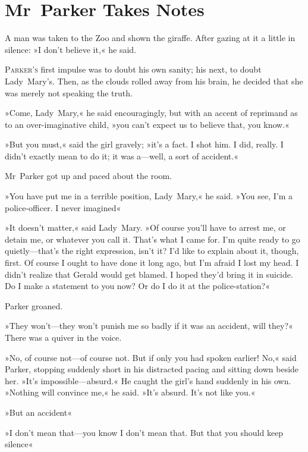 

\chapter{Mr~Parker Takes Notes}

\epigraph{A man was taken to the Zoo and shown the giraffe.  After gazing at it a little in silence: »I don't believe it,« he said.}{}


\lettrine[lines=4]{P}{arker's} first impulse was to doubt his own sanity; his next, to doubt Lady~Mary's. Then, as the clouds rolled away from his brain, he decided that she was merely not speaking the truth.

\zz
»Come, Lady~Mary,« he said encouragingly, but with an accent of reprimand as to an over-imaginative child, »you can't expect us to believe that, you know.«

»But you must,« said the girl gravely; »it's a fact. I shot him. I did, really. I didn't exactly mean to do it; it was a—well, a sort of accident.«

Mr~Parker got up and paced about the room.

»You have put me in a terrible position, Lady~Mary,« he said. »You see, I'm a police-officer. I never imagined\longdash«

»It doesn't matter,« said Lady~Mary. »Of course you'll have to arrest me, or detain me, or whatever you call it. That's what I came for. I'm quite ready to go quietly—that's the right expression, isn't it? I'd like to explain about it, though, first. Of course I ought to have done it long ago, but I'm afraid I lost my head. I didn't realize that Gerald would get blamed. I hoped they'd bring it in suicide. Do I make a statement to you now? Or do I do it at the police-station?«

Parker groaned.

»They won't—they won't punish me so badly if it was an accident, will they?« There was a quiver in the voice.

»No, of course not—of course not. But if only you had spoken earlier!  No,« said Parker, stopping suddenly short in his distracted pacing and sitting down beside her. »It's impossible—absurd.« He caught the girl's hand suddenly in his own. »Nothing will convince me,« he said.  »It's absurd. It's not like you.«

»But an accident\longdash«

»I don't mean that—you know I don't mean that. But that you should keep silence\longdash«


